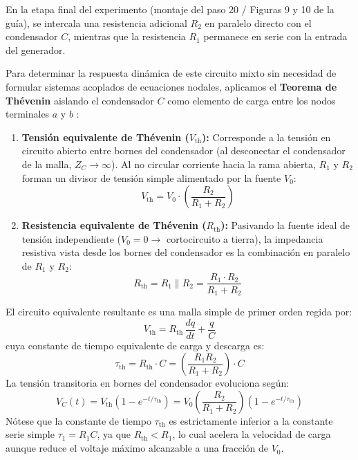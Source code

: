 En la etapa final del experimento (montaje del paso 20 / Figuras 9 y 10 de la guía), se intercala una resistencia adicional $R_2$ en paralelo directo con el condensador $C$, mientras que la resistencia $R_1$ permanece en serie con la entrada del generador.

Para determinar la respuesta dinámica de este circuito mixto sin necesidad de formular sistemas acoplados de ecuaciones nodales, aplicamos el \textbf{Teorema de Thévenin} aislando el condensador $C$ como elemento de carga entre los nodos terminales $a$ y $b$ \cite{alexander,boylestad}:
\begin{enumerate}
    \item \textbf{Tensión equivalente de Thévenin ($V_{\text{th}}$):} Corresponde a la tensión en circuito abierto entre bornes del condensador (al desconectar el condensador de la malla, $Z_C \to \infty$). Al no circular corriente hacia la rama abierta, $R_1$ y $R_2$ forman un divisor de tensión simple alimentado por la fuente $V_0$:
    \begin{equation}
        V_{\text{th}} = V_0 \cdot \left( \frac{R_2}{R_1 + R_2} \right)
        \label{eq:v_thevenin}
    \end{equation}
    \item \textbf{Resistencia equivalente de Thévenin ($R_{\text{th}}$):} Pasivando la fuente ideal de tensión independiente ($V_0 = 0 \to$ cortocircuito a tierra), la impedancia resistiva vista desde los bornes del condensador es la combinación en paralelo de $R_1$ y $R_2$:
    \begin{equation}
        R_{\text{th}} = R_1 \parallel R_2 = \frac{R_1 \cdot R_2}{R_1 + R_2}
        \label{eq:r_thevenin}
    \end{equation}
\end{enumerate}
El circuito equivalente resultante es una malla simple de primer orden regida por:
\begin{equation}
    V_{\text{th}} = R_{\text{th}}\,\frac{dq}{dt} + \frac{q}{C}
    \label{eq:edo_thevenin}
\end{equation}
cuya constante de tiempo equivalente de carga y descarga es:
\begin{equation}
    \tau_{\text{th}} = R_{\text{th}} \cdot C = \left( \frac{R_1 R_2}{R_1 + R_2} \right) \cdot C
    \label{eq:tau_thevenin}
\end{equation}
La tensión transitoria en bornes del condensador evoluciona según:
\begin{equation}
    V_C(t) = V_{\text{th}} \left( 1 - e^{-t / \tau_{\text{th}}} \right) = V_0 \left( \frac{R_2}{R_1 + R_2} \right) \left( 1 - e^{-t / \tau_{\text{th}}} \right)
    \label{eq:vc_thevenin}
\end{equation}
Nótese que la constante de tiempo $\tau_{\text{th}}$ es estrictamente inferior a la constante serie simple $\tau_1 = R_1 C$, ya que $R_{\text{th}} < R_1$, lo cual acelera la velocidad de carga aunque reduce el voltaje máximo alcanzable a una fracción de $V_0$.